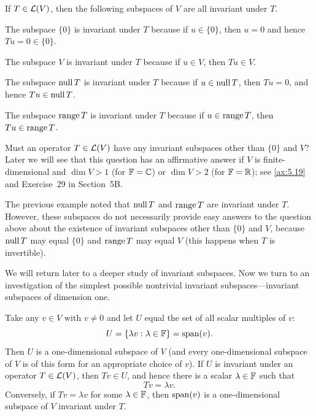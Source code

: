 \begin{example}\label{ax:5.4}
If $T\in\mathcal{L}(V)$, then the following subspaces of $V$ are all invariant under
$T$.
\begin{description}[font=\normalfont,align=right,labelwidth=3.4em,
  labelsep=.8em,leftmargin=4.2em,itemsep=1pt,topsep=3pt]
\item[$\{0\}$] The subspace $\{0\}$ is invariant under $T$ because if
  $u\in\{0\}$, then $u=0$ and hence $Tu=0\in\{0\}$.
\item[$V$] The subspace $V$ is invariant under $T$ because if $u\in V$, then
  $Tu\in V$.
\item[$\nul T$] The subspace $\nul T$ is invariant under $T$ because if
  $u\in\operatorname{null} T$, then $Tu=0$, and hence $Tu\in\operatorname{null} T$.
\item[$\range T$] The subspace $\range T$ is invariant under $T$ because if
  $u\in\operatorname{range} T$, then $Tu\in\operatorname{range} T$.
\end{description}
\end{example}

Must an operator $T\in\mathcal{L}(V)$ have any invariant subspaces other than $\{0\}$
and $V$? Later we will see that this question has an affirmative answer if $V$
is finite-dimensional and $\dim V>1$ (for $\mathbb{F}=\mathbb{C}$) or $\dim V>2$ (for
$\mathbb{F}=\mathbb{R}$); see \ref{ax:5.19} and Exercise~29 in Section~5B.

The previous example noted that $\nul T$ and $\range T$ are invariant under
$T$. However, these subspaces do not necessarily provide easy answers to the
question above about the existence of invariant subspaces other than $\{0\}$
and $V$, because $\nul T$ may equal $\{0\}$ and $\range T$ may equal $V$ (this
happens when $T$ is invertible).

We will return later to a deeper study of invariant subspaces. Now we turn to
an investigation of the simplest possible nontrivial invariant
subspaces---invariant subspaces of dimension one.

Take any $v\in V$ with $v\ne0$ and let $U$ equal the set of all scalar
multiples of $v$:
\[ U = \{\lambda v : \lambda\in\mathbb{F}\} = \operatorname{span}(v). \]
Then $U$ is a one-dimensional subspace of $V$ (and every one-dimensional
subspace of $V$ is of this form for an appropriate choice of $v$). If $U$ is
invariant under an operator $T\in\mathcal{L}(V)$, then $Tv\in U$, and hence there is
a scalar $\lambda\in\mathbb{F}$ such that
\[ Tv = \lambda v. \]
Conversely, if $Tv=\lambda v$ for some $\lambda\in\mathbb{F}$, then $\operatorname{span}(v)$ is a
one-dimensional subspace of $V$ invariant under $T$.

